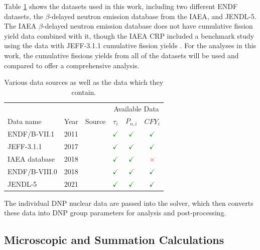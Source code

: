 \documentclass[hidelinks]{style/nseJournal}
\begin{document}
Table \ref{tab:datasources} shows the datasets used in this work, including two different \gls{ENDF} datasets, the $\beta$-delayed neutron emission database from the \gls{IAEA}, and \gls{JENDL}-5.
The \gls{IAEA} $\beta$-delayed neutron emission database does not have cumulative fission yield data combined with it, though the \gls{IAEA} \gls{CRP} included a benchmark study using the data with \gls{JEFF}-3.1.1 cumulative fission yields \cite{DIMITRIOU2021144}.
For the analyses in this work, the cumulative fissions yields from all of the datasets will be used and compared to offer a comprehensive analysis.

\begin{table}[H]
    \centering
    \caption{Various data sources as well as the data which they contain.}
    \begin{tabular}{lccccc}
    \hline
    & & & \multicolumn{3}{c}{Available Data}\\
    Data name & Year & Source & $\tau_i$ & $P_{n,i}$ & $CFY_i$\\
    \hline
      \gls{ENDF}/B-VII.1 & 2011 & \cite{chadwick2011endf} & \textcolor{green}{$\checkmark$} & \textcolor{green}{$\checkmark$} & \textcolor{green}{$\checkmark$}\\
      \gls{JEFF}-3.1.1 & 2017 & \cite{plompen2020joint} & \textcolor{green}{$\checkmark$} & \textcolor{green}{$\checkmark$} & \textcolor{green}{$\checkmark$}\\
      \gls{IAEA} database & 2018 & \cite{DIMITRIOU2021144} & \textcolor{green}{$\checkmark$} & \textcolor{green}{$\checkmark$} & \textcolor{red}{$\times$}\\
      \gls{ENDF}/B-VIII.0 & 2018 & \cite{Brown20181} & \textcolor{green}{$\checkmark$} & \textcolor{green}{$\checkmark$} & \textcolor{green}{$\checkmark$}\\
      \gls{JENDL}-5 & 2021 & \cite{iwamoto2023japanese} & \textcolor{green}{$\checkmark$} & \textcolor{green}{$\checkmark$} & \textcolor{green}{$\checkmark$}\\
    \hline
    \end{tabular}
    \label{tab:datasources}
\end{table}

The individual \gls{DNP} nuclear data are passed into the solver, which then converts these data into \gls{DNP} group parameters for analysis and post-processing.

\subsection{Microscopic and Summation Calculations}
\end{document}
